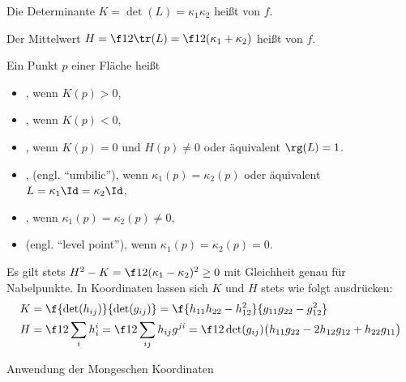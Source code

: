 \begin{df}
	Die Determinante $K = \det(L) = \kappa_1 \kappa_2$ heißt  von $f$.

	Der Mittelwert $H = \f 12 \tr(L) = \f 12 (\kappa_1 + \kappa_2)$ heißt  von $f$.

	Ein Punkt $p$ einer Fläche heißt
	\begin{itemize}
		\item
			, wenn $K(p) > 0$,
		\item
			, wenn $K(p) < 0$,
		\item
			, wenn $K(p) = 0$ und $H(p) \neq 0$ oder äquivalent $\rg(L) = 1$.
		\item
			, (engl. “umbilic”), wenn $\kappa_1(p) = \kappa_2(p)$ oder äquivalent $L = \kappa_1 \Id = \kappa_2 \Id$,
		\item
			, wenn $\kappa_1(p) = \kappa_2(p) \neq 0$,
		\item
			 (engl. “level point”), wenn $\kappa_1(p) = \kappa_2(p) = 0$.
	\end{itemize}
\end{df}

\begin{kor}
	Es gilt stets $H^2 - K = \f 12 (\kappa_1 - \kappa_2)^2 \ge 0$ mit Gleichheit genau für Nabelpunkte.
	In Koordinaten lassen sich $K$ und $H$ stets wie folgt ausdrücken:
	\begin{align*}
		K &= \f{\det(h_{ij})}{\det(g_{ij})}
		= \f{h_{11}h_{22} - h_{12}^2}{g_{11}g_{22} - g_{12}^2} \\
		H &= \f 12 \sum_{i} h_{i}^i = \f 12 \sum_{ij} h_{ij} g^{ji}
		= \f 1{2\det(g_{ij})} \big( h_{11} g_{22} - 2h_{12}g_{12} + h_{22}g_{11} \big)
	\end{align*}
\end{kor}


Anwendung der Mongeschen Koordinaten

